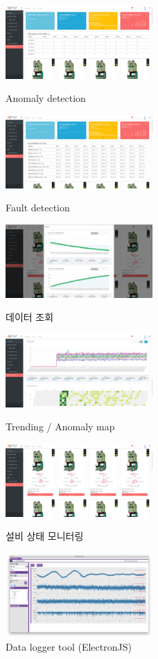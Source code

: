 \begin{figure}[!ht]
	\begin{fullwidth}
		\parbox{0.5\textwidth}{
			\centering
			\includegraphics[width=0.5\textwidth]{images/new_dashboard_02.png}
			\caption*{Anomaly detection}
		}\qquad
		\parbox{0.5\textwidth}{
			\centering
			\includegraphics[width=0.5\textwidth]{images/new_dashboard_03.png}
			\caption*{Fault detection}
		}\qquad
		\parbox{0.5\textwidth}{
			\centering
			\includegraphics[width=0.5\textwidth]{images/new_dashboard_05.png}
			\caption*{데이터 조회}
		}
		\parbox{0.5\textwidth}{
			\centering
			\includegraphics[width=0.5\textwidth]{images/new_dashboard_06.png}
			\caption*{Trending / Anomaly map}
		}\qquad
		\parbox{0.5\textwidth}{
			\centering
			\includegraphics[width=0.5\textwidth]{images/new_dashboard_04.png}
			\caption*{설비 상태 모니터링}
		}\qquad
		\parbox{0.5\textwidth}{
			\centering
			\includegraphics[width=0.5\textwidth]{images/mcdl-01.png}
			\caption*{Data logger tool (ElectronJS)}
		}
	\end{fullwidth}
\end{figure}